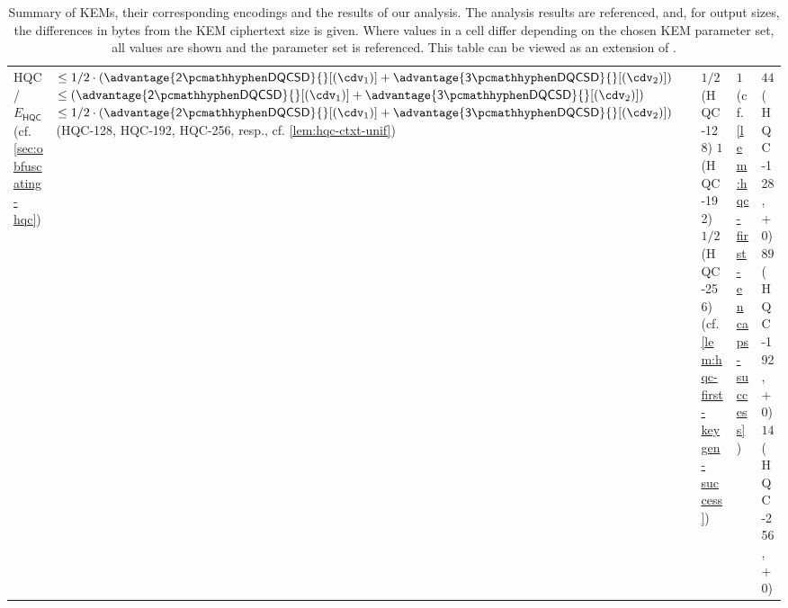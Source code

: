 \begin{table}
{\begin{tabular}{@{} L{0.18\textwidth-\tabcolsep} | L{0.41\tabcolsep} L{0.19\tabcolsep} L{0.16\tabcolsep} L{0.23\textwidth-\tabcolsep} @{}}
        HQC \cite{NISTPQC-R4:HQC22} / $E_\mathsf{HQC}$ \newline
        (cf. \cref{sec:obfuscating-hqc})
        & $\leq 1/2 \cdot \left( \advantage{\twodqcsd}{}[(\cdv_1)] + \advantage{\threedqcsd}{}[(\cdv_2)] \right)$\newline
        $\leq \left( \advantage{\twodqcsd}{}[(\cdv_1)] + \advantage{\threedqcsd}{}[(\cdv_2)] \right)$\newline
        $\leq 1/2 \cdot \left( \advantage{\twodqcsd}{}[(\cdv_1)] + \advantage{\threedqcsd}{}[(\cdv_2)] \right)$\newline
        (\textsf{HQC-128}, \textsf{HQC-192}, \textsf{HQC-256}, resp.,\newline
        cf. \cref{lem:hqc-ctxt-unif})
        & $1/2$ (\textsf{HQC-128})\newline
          $1$ (\textsf{HQC-192})\newline
          $1/2$ (\textsf{HQC-256})\newline
          (cf. \cref{lem:hqc-first-keygen-success})
        & $1$\newline
          (cf. \cref{lem:hqc-first-encaps-success})
        & $4433$ (\textsf{HQC-128}, +0)\newline
          $8978$ (\textsf{HQC-192}, +0)\newline
          $14421$ (\textsf{HQC-256}, +0)\newline \\
    \end{tabular}
    }
    \caption[
        Summary of KEMs, their corresponding encodings and the results of our analysis.
    ]{
        Summary of KEMs, their corresponding encodings and the results of our analysis. The analysis results are referenced, and, for output sizes, the differences in bytes from the KEM ciphertext size is given. Where values in a cell differ depending on the chosen KEM parameter set, all values are shown and the parameter set is referenced. This table can be viewed as an extension of \cite[Table~2]{CCS:GunSteVei24}.}
    \label{tab:obfuscation-summary}
\end{table}
